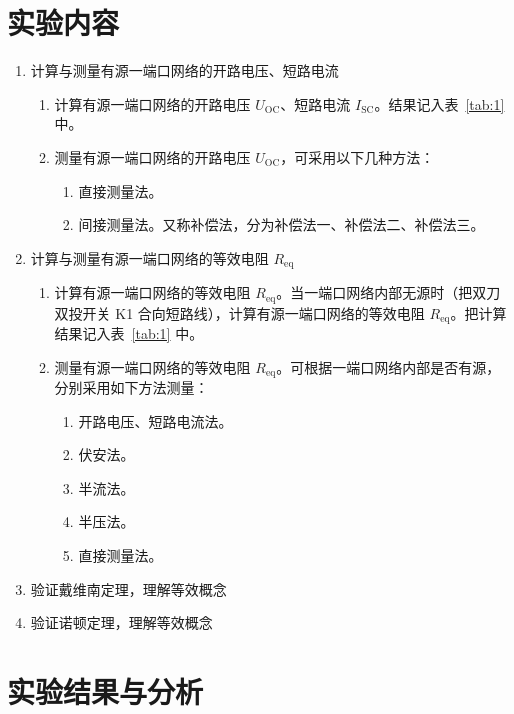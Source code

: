 \documentclass[a4paper,utf8]{article}
\begin{document}
\section{实验内容}
\begin{enumerate}
    \item 计算与测量有源一端口网络的开路电压、短路电流
    \begin{enumerate}
        \item 计算有源一端口网络的开路电压 $U_\text{OC}$、短路电流 $I_\text{SC}$。结果记入表~\ref{tab:1} 中。
        \item 测量有源一端口网络的开路电压 $U_\text{OC}$，可采用以下几种方法：
        \begin{enumerate}
            \item 直接测量法。
            \item 间接测量法。又称补偿法，分为补偿法一、补偿法二、补偿法三。
        \end{enumerate}
    \end{enumerate}
    \item 计算与测量有源一端口网络的等效电阻 $R_\text{eq}$
    \begin{enumerate}
        \item 计算有源一端口网络的等效电阻 $R_\text{eq}$。当一端口网络内部无源时（把双刀双投开关 K1 合向短路线），计算有源一端口网络的等效电阻 $R_\text{eq}$。把计算结果记入表~\ref{tab:1} 中。
        \item 测量有源一端口网络的等效电阻 $R_\text{eq}$。可根据一端口网络内部是否有源，分别采用如下方法测量：
        \begin{enumerate}
            \item 开路电压、短路电流法。
            \item 伏安法。
            \item 半流法。
            \item 半压法。
            \item 直接测量法。
        \end{enumerate}
    \end{enumerate}
    \item 验证戴维南定理，理解等效概念
    \item 验证诺顿定理，理解等效概念
\end{enumerate}

\section{实验结果与分析}
\end{document}

